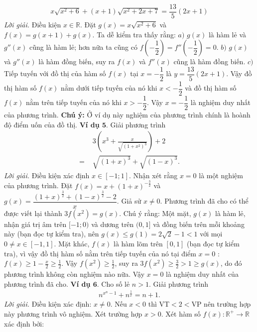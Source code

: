 \begin{multicols}{2}
\begin{align*}
		x\sqrt{x^2\!+\!6}\!+\!(x\!+\!1)\sqrt{x^2\!+\!2x\!+\!7}\!=\!\dfrac{13}{5}(2x\!+\!1)
	\end{align*}
	\textit{Lời giải.}  Điều kiện $x\in\mathbb R$. Đặt $g(x)=x\sqrt{x^2+6}$ và $f(x)=g(x+1)+g(x)$.
	\vskip 0.1cm
	Ta dễ kiểm tra thấy rằng:
	\vskip 0.1cm
	$a)$ $g(x)$ là hàm lẻ và $g''(x)$ cũng là hàm lẻ; hơn nữa ta cũng có $f(-\dfrac 12)=f''(-\dfrac 12)=0$.
	\vskip 0.1cm
	$b)$ $g(x)$ và $g''(x)$ là hàm đồng biến, suy ra $f(x)$ và $f''(x)$ cũng là hàm đồng biến.
	\vskip 0.1cm
	$c)$ Tiếp tuyến với đồ thị của hàm số  $f(x)$ tại $x=-\dfrac 12$ là $y=\dfrac{13}5(2x+1)$.
	\vskip 0.1cm
	Vậy đồ thị hàm số $f(x)$ nằm dưới tiếp tuyến của nó khi $x<-\dfrac 12$ và đồ thị hàm số $f(x)$ nằm trên tiếp tuyến của nó khi $x>-\dfrac 12$.
	\vskip 0.1cm
	Vậy $x=-\dfrac{1}{2}$ là nghiệm duy nhất của phương trình.
	\vskip 0.1cm
	\textbf{\color{hoccungpi}Chú ý:} Ở ví dụ này nghiệm của phương trình chính là hoành độ điểm uốn của đồ thị.
	\vskip 0.1cm
	\textbf{\color{hoccungpi}Ví dụ $\pmb{5.}$} Giải phương trình
	\begin{align*}
		&3\left(x^{3}+\frac{x}{\sqrt{\left(1+x^{2} \right)^{3}}} \right)+2\\
		=\,\,&\sqrt{\left(1+x \right)^{3}}+\sqrt{\left(1-x \right)^{3}}.
	\end{align*}
	\textit{Lời giải.}  Điều kiện xác định $x\in[-1;1]$. Nhận xét rằng $x=0$ là một nghiệm của phương trình. Đặt $f(x)=x+(1+x)^{-\frac 32}$ và $g(x)=\dfrac{(1+x)^{\frac 32}+(1-x)^{\frac 32}-2}x$.
	\vskip 0.1cm
	Giả sử $x\ne 0$. Phương trình đã cho có thể được viết lại thành $3f(x^2)=g(x)$.
	\vskip 0.1cm
	Chú ý rằng:
	\vskip 0.1cm
	Một mặt, $g(x)$ là hàm lẻ, nhận giá trị âm trên $[-1;0)$ và dương trên $(0, 1]$ và đồng biến trên mỗi khoảng này (bạn đọc tự kiểm tra), nên $g(x)\le g(1)=2\sqrt 2-1 <1$ với mọi $0\ne  x\in[-1,1]$.
	\vskip 0.1cm
	Mặt khác, $f(x)$ là hàm lõm trên $[0,1]$ (bạn đọc tự kiểm tra), vì vậy đồ thị hàm số nằm trên tiếp tuyến của nó tại điểm $x=0$ : $f(x)\ge 1-\frac x2\ge \frac 12$.
	\vskip 0.1cm
	Vậy $f(x^2)\ge \frac 12$, suy ra $3f(x^2)\ge \frac 32 > 1\ge g(x)$, do đó phương trình không còn nghiệm nào nữa. 
	\vskip 0.1cm
	Vậy $x=0$ là nghiệm duy nhất của phương trình đã cho.
	\vskip 0.1cm
	\textbf{\color{hoccungpi}Ví dụ $\pmb{6.}$} Cho số lẻ $n>1$. Giải phương trình
	\begin{align*}
		n^{x^n-1}+n^{\frac{1}{x}}=n+1.
	\end{align*}
	\textit{Lời giải.} Điều kiện xác định: $x \neq 0$. 
	Nếu $x<0$ thì VT$<2<$VP nên trường hợp này phương trình vô nghiệm.
	\vskip 0.1cm
	Xét trường hợp $x>0$. Xét hàm số $f(x):\mathbb R^+\to \mathbb R$ xác định bởi:

\end{multicols}
